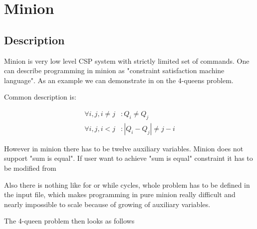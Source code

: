 \section{Minion}

\subsection{Description}

Minion is very low level CSP system with strictly limited set of commands. One 
can describe programming in minion as "constraint satisfaction machine language".
As an example we can demonstrate in on the 4-queens problem.

Common description is:

\begin{align}
\forall i,j, i \neq j & : Q_i \neq Q_j \\
\forall i,j, i < j & : | Q_i - Q_j | \neq j - i 
\end{align}

However in minion there has to be twelve auxiliary variables. Minion does not 
support "sum is equal". If user want to achieve "sum is equal" constraint it has 
to be modified from


Also there is nothing like for or while cycles, whole problem has to be defined in
the input file, which makes programming in pure minion really difficult and nearly
impossible to scale because of growing of auxiliary variables.

The 4-queen problem then looks as follows

